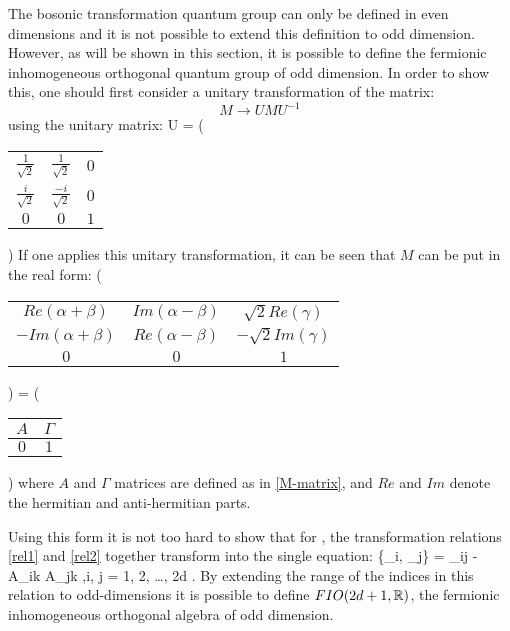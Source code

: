 The bosonic transformation quantum group \BISp can only be defined
in even dimensions and it is not possible to extend this definition
to odd dimension. However, as will be shown in this section, it is
possible to define the fermionic inhomogeneous orthogonal quantum
group of odd dimension. In order to show this, one should first
consider a unitary transformation of the \FIO matrix:
\[
M \rightarrow UMU^{-1}
\]
using the unitary matrix:
\beq U = \left(
\begin{tabular}{cc|c}
$\frac{1}{\sqrt{2}}$ & $\frac{1}{\sqrt{2}}$ & $0$ \\
$\frac{i}{\sqrt{2}}$ & $\frac{-i}{\sqrt{2}}$ & $0$ \\
\hline $0$ & $0$ & $1$
\end{tabular}
\right)
\eeq
If one applies this unitary transformation, it can be seen that
$M$ can be put in the real form:
\beq
\left(
\begin{tabular}{cc|c}
$Re(\alpha + \beta)$ & $Im(\alpha - \beta)$ & $\sqrt{2}Re(\gamma)$ \\
$-Im(\alpha + \beta)$ & $Re(\alpha - \beta)$ & $-\sqrt{2}Im(\gamma)$ \\
\hline $0$ & $0$ & $1$
\end{tabular}
\right) = \left(
\begin{tabular}{c|c}
$A$ & $\Gamma$ \\
\hline $0$ & $1$
\end{tabular}
\right)
\eeq
where $A$ and $\Gamma$ matrices are defined as in
\eqref{M-matrix}, and $Re$ and $Im$ denote the hermitian and
anti-hermitian parts.

Using this form it is not too hard to show that for \FIO,
the transformation relations \eqref{rel1} and \eqref{rel2}
together transform into the single equation:
\beq
\{\Gamma_i, \Gamma_j\} = \delta_{ij} - A_{ik} A_{jk} \quad,\quad i, j = 1, 2, \ldots , 2d .
\label{relcombined}
\eeq
By extending the range of the indices in this relation to
odd-dimensions it is possible
to define $FIO(2d + 1, \mathbb{R})$, the fermionic inhomogeneous
orthogonal algebra of odd dimension.

